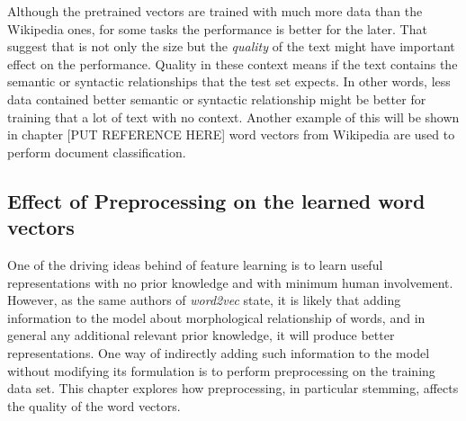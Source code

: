 Although the pretrained vectors are trained with much more data
than the Wikipedia ones, for some tasks the performance is better for the
later. That suggest that is not only the size but the \textit{quality} of the
text might have important effect on the performance. Quality in these context
means if the text contains the semantic or syntactic relationships  that the
test set expects. In other words, less data contained better semantic or
syntactic relationship might be better for training that a lot of text with
no context. Another example of this will be shown in chapter [PUT REFERENCE
HERE] word vectors from Wikipedia are used to perform document classification.





\subsection{Effect of Preprocessing on the learned word vectors}
\label{sec:sub:effects_of_preprocessing_on_learned_word_vectors}

One of the driving ideas behind of feature learning is to learn useful
representations with no prior knowledge and with minimum human
involvement. However, as the same authors of \textit{word2vec} state, it is likely
that adding information to the model about morphological relationship of
words, and in general any additional relevant prior knowledge, it   will produce better
representations.  One way of indirectly adding such information to the model
without modifying its formulation is to perform preprocessing on the training
data set. This chapter explores how preprocessing, in particular stemming,  affects the
quality of the word vectors. 
 

